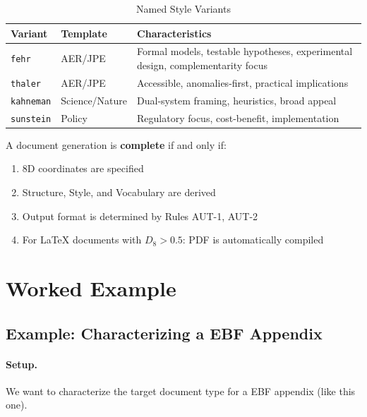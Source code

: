 \begin{table}[htbp]
\centering
\caption{Named Style Variants}
\label{tab:style-variants}
\renewcommand{\arraystretch}{1.3}
\begin{tabular}{@{}llp{6cm}@{}}
\toprule
\textbf{Variant} & \textbf{Template} & \textbf{Characteristics} \\
\midrule
\texttt{fehr} & AER/JPE & Formal models, testable hypotheses, experimental design, complementarity focus \\
\texttt{thaler} & AER/JPE & Accessible, anomalies-first, practical implications \\
\texttt{kahneman} & Science/Nature & Dual-system framing, heuristics, broad appeal \\
\texttt{sunstein} & Policy & Regulatory focus, cost-benefit, implementation \\
\bottomrule
\end{tabular}
\end{table}

\begin{tcolorbox}[colback=green!5!white, colframe=green!75!black,
    title=Axiom AUT-1: Output Completeness]
A document generation is \textbf{complete} if and only if:
\begin{enumerate}[nosep]
\item 8D coordinates are specified
\item Structure, Style, and Vocabulary are derived
\item Output format is determined by Rules AUT-1, AUT-2
\item For LaTeX documents with $D_8 > 0.5$: PDF is automatically compiled
\end{enumerate}
\end{tcolorbox}


\section{Worked Example}
\label{sec:doctype-example}

\subsection{Example: Characterizing a EBF Appendix}

\paragraph{Setup.} We want to characterize the target document type for a
EBF appendix (like this one).

